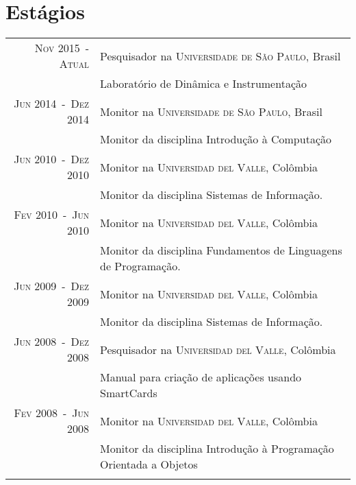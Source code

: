 \documentclass[a4paper,10pt]{article}
\begin{document}
\section{Estágios}
\begin{tabular}{rl}

    \textsc{Nov 2015~-~Atual}     & Pesquisador na \textsc{Universidade de São Paulo}, Brasil \\
                                  &\footnotesize{Laboratório de Dinâmica e Instrumentação} \\

    \textsc{Jun 2014~-~Dez 2014}  & Monitor na \textsc{Universidade de São Paulo}, Brasil \\
                                  &\footnotesize{Monitor da disciplina Introdução à Computação} \\

    \textsc{Jun 2010~-~Dez 2010}  & Monitor na \textsc{Universidad del Valle}, Colômbia \\
                                  &\footnotesize{Monitor da disciplina Sistemas de Informação.} \\

    \textsc{Fev 2010~-~Jun 2010}  & Monitor na \textsc{Universidad del Valle}, Colômbia \\
                                  &\footnotesize{Monitor da disciplina Fundamentos de Linguagens de Programação.} \\

    \textsc{Jun 2009~-~Dez 2009}  & Monitor na \textsc{Universidad del Valle}, Colômbia \\
                                  &\footnotesize{Monitor da disciplina Sistemas de Informação.} \\

    \textsc{Jun 2008~-~Dez 2008}  & Pesquisador na \textsc{Universidad del Valle}, Colômbia \\
                                  &\footnotesize{Manual para criação de aplicações usando SmartCards} \\

    \textsc{Fev 2008~-~Jun 2008}  & Monitor na \textsc{Universidad del Valle}, Colômbia \\
                                  &\footnotesize{Monitor da disciplina Introdução à Programação Orientada a Objetos} \\
                                  &\\

\end{tabular}
\end{document}
